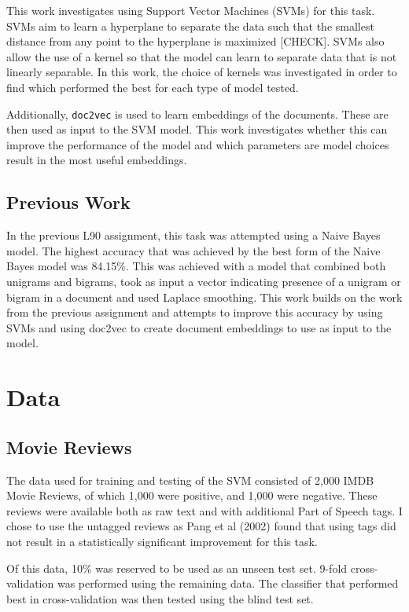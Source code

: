 \documentclass[twocolumn]{article}
\begin{document}
This work investigates using Support Vector Machines (SVMs) for this task. SVMs aim to learn a hyperplane to separate the data such that the smallest distance from any point to the hyperplane is maximized [CHECK]. SVMs also allow the use of a kernel so that the model can learn to separate data that is not linearly separable. In this work, the choice of kernels was investigated in order to find which performed the best for each type of model tested.

Additionally, \texttt{doc2vec} is used to learn embeddings of the documents. These are then used as input to the SVM model. This work investigates whether this can improve the performance of the model and which parameters are model choices result in the most useful embeddings.

\subsection{Previous Work}


In the previous L90 assignment, this task was attempted using a Naive Bayes model. The highest accuracy that was achieved by the best form of the Naive Bayes model was 84.15\%. This was achieved with a model that combined both unigrams and bigrams, took as input a vector indicating presence of a unigram or bigram in a document and used Laplace smoothing. This work builds on the work from the previous assignment and attempts to improve this accuracy by using SVMs and using doc2vec to create document embeddings to use as input to the model.

\section{Data}


\subsection{Movie Reviews}


The data used for training and testing of the SVM consisted of 2,000 IMDB Movie Reviews, of which 1,000 were positive, and 1,000 were negative. These reviews were available both as raw text and with additional Part of Speech tags. I chose to use the untagged reviews as Pang et al (2002) \cite{pang} found that using tags did not result in a statistically significant improvement for this task. 

Of this data, 10\% was reserved to be used as an unseen test set. 9-fold cross-validation was performed using the remaining data. The classifier that performed best in cross-validation was then tested using the blind test set.
\end{document}

